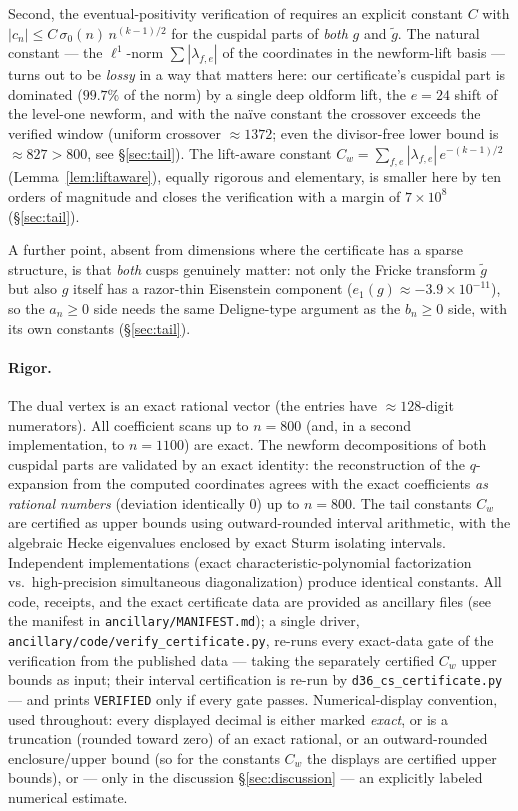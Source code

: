 \documentclass[11pt]{article}
\theoremstyle{remark}
\begin{document}
Second, the eventual-positivity verification of \cite[\S5]{CT} requires
an explicit constant $C$ with $|c_n|\le C\,\sigma_0(n)\,n^{(k-1)/2}$ for
the cuspidal parts of \emph{both} $g$ and $\tilde g$. The natural
constant --- the $\ell^1$-norm $\sum|\lambda_{f,e}|$ of the coordinates
in the newform-lift basis --- turns out to be \emph{lossy} in a way that
matters here: our certificate's cuspidal part is dominated ($99.7\%$ of
the norm) by a single deep oldform lift, the $e=24$ shift of the level-one
newform, and with the na\"ive constant the crossover exceeds the
verified window (uniform crossover $\approx1372$; even the divisor-free
lower bound is $\approx827>800$, see \S\ref{sec:tail}). The lift-aware constant
$C_w=\sum_{f,e}|\lambda_{f,e}|\,e^{-(k-1)/2}$
(Lemma~\ref{lem:liftaware}), equally rigorous and elementary, is smaller
here by ten orders of magnitude and closes the verification with a
margin of $7\times 10^8$ (\S\ref{sec:tail}).

A further point, absent from dimensions where the certificate has a
sparse structure, is that \emph{both} cusps genuinely matter: not only
the Fricke transform $\tilde g$ but also $g$ itself has a razor-thin
Eisenstein component ($e_1(g)\approx -3.9\times10^{-11}$), so the
$a_n\ge 0$ side needs the same Deligne-type argument as the
$b_n\ge 0$ side, with its own constants (\S\ref{sec:tail}).

\paragraph{Rigor.} The dual vertex is an exact rational vector (the
entries have $\approx 128$-digit numerators). All coefficient scans up
to $n=800$ (and, in a second implementation, to $n=1100$) are exact.
The newform decompositions of both cuspidal parts are validated by an
exact identity: the reconstruction of the $q$-expansion from the
computed coordinates agrees with the exact coefficients \emph{as
rational numbers} (deviation identically $0$) up to $n=800$. The tail
constants $C_w$ are certified as upper bounds using outward-rounded
interval arithmetic, with the algebraic Hecke eigenvalues enclosed by
exact Sturm isolating intervals. Independent implementations (exact
characteristic-polynomial factorization vs.\ high-precision simultaneous
diagonalization) produce identical constants. All code, receipts, and
the exact certificate data are provided as ancillary files (see the
manifest in \texttt{ancillary/MANIFEST.md}); a single driver,
\texttt{ancillary/code/verify\_certificate.py}, re-runs every
exact-data gate of the verification from the published data --- taking
the separately certified $C_w$ upper bounds as input; their interval
certification is re-run by \texttt{d36\_cs\_certificate.py} --- and
prints \texttt{VERIFIED} only if every gate passes.
Numerical-display convention, used throughout: every displayed decimal
is either marked \emph{exact}, or is a truncation (rounded toward zero)
of an exact rational, or an outward-rounded enclosure/upper bound
(so for the constants $C_w$ the displays are certified upper bounds),
or --- only in the discussion \S\ref{sec:discussion} --- an explicitly
labeled numerical estimate.
\end{document}
